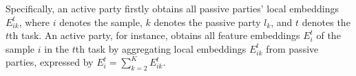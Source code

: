 Specifically, an active party firstly obtains all passive parties' local embeddings $E_{ik}^{t}$, where $i$ denotes the sample, $k$ denotes the passive party $l_k$, and $t$ denotes the $t$th task.  
An active party, for instance, obtains all feature embeddings $E_{i}^{t}$ of the sample $i$ in the $t$th task by aggregating local embeddings $E_{ik}^{t}$ from passive parties, expressed by $E_{i}^t = \sum_{k = 2}^{K} E_{ik}^{t}$.
%
%
